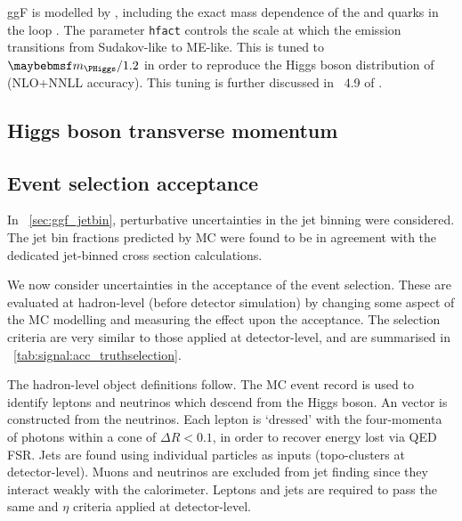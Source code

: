 
\ac{ggF} is modelled by , including the exact mass 
dependence of the \Ptop and \Pbottom quarks in the loop \cite{Powheg-ggF-quarkmasses}. 
The \powhegbox parameter \verb|hfact| controls the scale at which the emission 
transitions from Sudakov-like to ME-like. This is tuned to $\mH/1.2$ in order to 
reproduce the Higgs boson \pt distribution of \hqt \cite{HqT2} (NLO+NNLL accuracy). This 
tuning is further discussed in \Section~4.9 of \Reference \cite{YR2}.



\subsection{Higgs boson transverse momentum}



\subsection{Event selection acceptance}

In \Section~\ref{sec:ggf_jetbin}, perturbative uncertainties in the jet binning were 
considered. The jet bin fractions predicted by MC were found to be in agreement with the 
dedicated jet-binned cross section calculations. 

We now consider uncertainties in the acceptance of the event selection. These are 
evaluated at hadron-level (\ie before detector simulation) by changing some aspect of 
the MC modelling and measuring the effect upon the acceptance. The selection criteria are 
very similar to those applied at detector-level, and are summarised in 
\Table~\ref{tab:signal:acc_truthselection}.

The hadron-level object definitions follow. The MC event record is used to identify 
leptons and neutrinos which descend from the Higgs boson. An \metvec vector is 
constructed from the neutrinos. Each lepton is `dressed' with the four-momenta of photons 
within a cone of $\Delta R < 0.1$, in order to recover energy lost via QED FSR. Jets are 
found using individual particles as inputs (\cf topo-clusters at detector-level). Muons 
and neutrinos are excluded from jet finding since they interact weakly with the 
calorimeter. Leptons and jets are required to pass the same \pt and $\eta$ criteria 
applied at detector-level.

